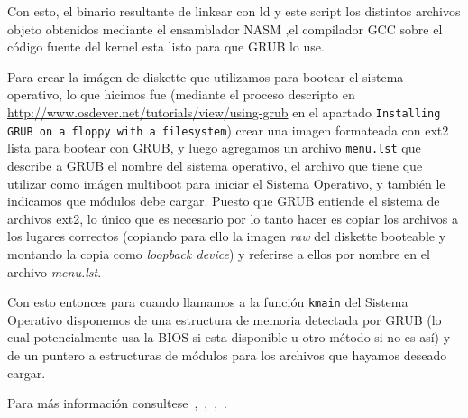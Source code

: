 Con esto, el binario resultante de linkear con ld y este script los distintos archivos objeto obtenidos mediante el ensamblador NASM
,el compilador GCC sobre el c\'odigo fuente del kernel esta listo para que GRUB lo use.

Para crear la im\'agen de diskette que utilizamos para bootear el sistema operativo, lo que hicimos fue (mediante el proceso descripto
en \url{http://www.osdever.net/tutorials/view/using-grub} en el apartado \texttt{Installing GRUB on a floppy with a filesystem}) crear
una imagen formateada con ext2 lista para bootear con GRUB, y luego agregamos un archivo \texttt{menu.lst} que describe a GRUB el
nombre del sistema operativo, el archivo que tiene que utilizar como im\'agen multiboot para iniciar el Sistema Operativo, y tambi\'en
le indicamos que m\'odulos debe cargar. Puesto que GRUB entiende el sistema de archivos ext2, lo \'unico que es necesario por lo tanto hacer
es copiar los archivos a los lugares correctos (copiando para ello la imagen \textit{raw} del diskette booteable y montando la copia como 
\textit{loopback device}) y referirse a ellos por nombre en el archivo \textit{menu.lst}.

Con esto entonces para cuando llamamos a la funci\'on \texttt{kmain} del Sistema Operativo disponemos de una estructura de memoria detectada
por GRUB (lo cual potencialmente usa la BIOS si esta disponible u otro m\'etodo si no es as\'i) y de un puntero a estructuras de m\'odulos
para los archivos que hayamos deseado cargar.

Para m\'as informaci\'on consultese~\cite{jamesmolloy},~\cite{osdev},~\cite{osdever},~\cite{gnugrub}.
